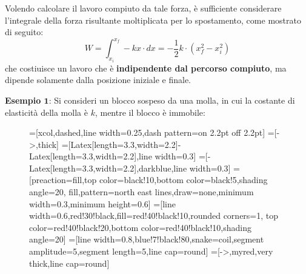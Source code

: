 \documentclass[a4paper]{extarticle}
\begin{document}
\noindent
Volendo calcolare il lavoro compiuto da tale forza, è sufficiente considerare l'integrale della forza risultante moltiplicata per lo spostamento, come mostrato di seguito:
\[\boxed{W=\int_{x_i}^{x_f}-k x \cdot dx = - \frac{1}{2}k \cdot (x_f^2-x_i^2)}\]
che costiuisce un lavoro che è \textbf{indipendente dal percorso compiuto}, ma dipende solamente dalla posizione iniziale e finale.

\newpage
\noindent
\textbf{Esempio $\boldsymbol{1}$}: Si consideri un blocco sospeso da una molla, in cui la costante di elasticità della molla è $k$, mentre il blocco è immobile:

\begin{figure}[H]
  \centering
  =[xcol,dashed,line width=0.25,dash pattern=on 2.2pt off 2.2pt]
  =[->,thick] %
  =[{Latex[length=3.3,width=2.2]}-{Latex[length=3.3,width=2.2]},line width=0.3]
  =[-{Latex[length=3.3,width=2.2]},darkblue,line width=0.3]
  =[preaction={fill,top color=black!10,bottom color=black!5,shading angle=20},
                      fill,pattern=north east lines,draw=none,minimum width=0.3,minimum height=0.6]
  =[line width=0.6,red!30!black,fill=red!40!black!10,rounded corners=1,
                    top color=red!40!black!20,bottom color=red!40!black!10,shading angle=20]
  =[line width=0.8,blue!7!black!80,snake=coil,segment amplitude=5,segment length=5,line cap=round]
  \tikzset{>=latex} %
  =[->,myred,very thick,line cap=round]
  \def\tick#1#2{\draw[thick] (#1)++(#2:0.1) --++ (#2-180:0.2)}


\end{figure}
\end{document}
